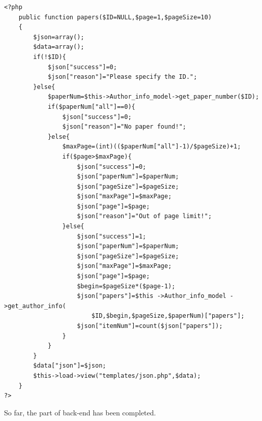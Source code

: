 \documentclass[a4paper]{article}
\begin{document}
\begin{verbatim}
<?php
    public function papers($ID=NULL,$page=1,$pageSize=10)
    {
        $json=array();
        $data=array();
        if(!$ID){
            $json["success"]=0;
            $json["reason"]="Please specify the ID.";
        }else{
            $paperNum=$this->Author_info_model->get_paper_number($ID);
            if($paperNum["all"]==0){
                $json["success"]=0;
                $json["reason"]="No paper found!";
            }else{
                $maxPage=(int)(($paperNum["all"]-1)/$pageSize)+1;
                if($page>$maxPage){
                    $json["success"]=0;
                    $json["paperNum"]=$paperNum;
                    $json["pageSize"]=$pageSize;
                    $json["maxPage"]=$maxPage;
                    $json["page"]=$page;
                    $json["reason"]="Out of page limit!";
                }else{
                    $json["success"]=1;
                    $json["paperNum"]=$paperNum;
                    $json["pageSize"]=$pageSize;
                    $json["maxPage"]=$maxPage;
                    $json["page"]=$page;
                    $begin=$pageSize*($page-1);
                    $json["papers"]=$this ->Author_info_model ->get_author_info(
                        $ID,$begin,$pageSize,$paperNum)["papers"];
                    $json["itemNum"]=count($json["papers"]);
                }
            }
        }
        $data["json"]=$json;
        $this->load->view("templates/json.php",$data);
    }
?>
\end{verbatim}
So far, the part of back-end has been completed.
\end{document}
